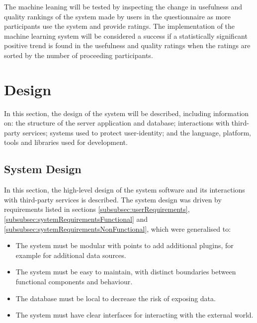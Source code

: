 \documentclass[authoryearcitations]{UoYCSproject}
\begin{document}
The machine leaning will be tested by inspecting the change in usefulness and quality rankings of the system made by users in the questionnaire as more participants use the system and provide ratings. The implementation of the machine learning system will be considered a success if a statistically significant positive trend is found in the usefulness and quality ratings when the ratings are sorted by the number of proceeding participants.

\newpage
\chapter{Design}
\label{sec:design}
In this section, the design of the system will be described, including information on: the structure of the server application and database; interactions with third-party services; systems used to protect user-identity; and the language, platform, tools and libraries used for development.

\section{System Design}
\label{sec:sysDesign}
In this section, the high-level design of the system software and its interactions with third-party services is described.  The system design was driven by requirements listed in sections \ref{subsubsec:userRequirements}, \ref{subsubsec:systemRequirementsFunctional} and \ref{subsubsec:systemRequirementsNonFunctional}, which were generalised to:

\begin{itemize}
    \item The system must be modular with points to add additional plugins, for example for additional data sources.
    \item The system must be easy to maintain, with distinct boundaries between functional components and behaviour.
    \item The database must be local to decrease the risk of exposing data.
    \item The system must have clear interfaces for interacting with the external world.
\end{itemize}
\end{document}
